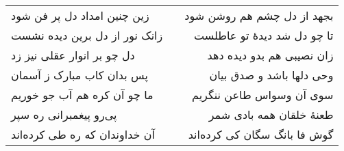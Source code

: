 \begin{center}
\begin{longtable}{l p{0.5cm} r}
زین چنین امداد دل پر فن شود
&&
بجهد از دل چشم هم روشن شود
\\
زانک نور از دل برین دیده نشست
&&
تا چو دل شد دیدهٔ تو عاطلست
\\
دل چو بر انوار عقلی نیز زد
&&
زان نصیبی هم بدو دیده دهد
\\
پس بدان کاب مبارک ز آسمان
&&
وحی دلها باشد و صدق بیان
\\
ما چو آن کره هم آب جو خوریم
&&
سوی آن وسواس طاعن ننگریم
\\
پی‌رو پیغمبرانی ره سپر
&&
طعنهٔ خلقان همه بادی شمر
\\
آن خداوندان که ره طی کرده‌اند
&&
گوش فا بانگ سگان کی کرده‌اند
\\
\end{longtable}
\end{center}
